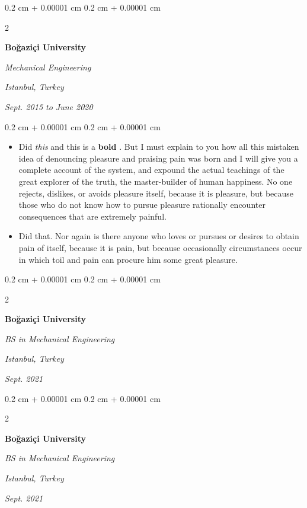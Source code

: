 \documentclass[10pt, letterpaper]{article}
\newenvironment{highlights}{
    \begin{itemize}[
        topsep=0.10 cm,
        parsep=0.10 cm,
        partopsep=0pt,
        itemsep=0pt,
        leftmargin=0.4 cm + 10pt
    ]
}{
    \end{itemize}
} %
\newenvironment{onecolentry}{
    \begin{adjustwidth}{
        0.2 cm + 0.00001 cm
    }{
        0.2 cm + 0.00001 cm
    }
}{
    \end{adjustwidth}
} %
\newenvironment{twocolentry}[2][]{
    \onecolentry
    \def\secondColumn{#2}
    \setcolumnwidth{\fill, 4.5 cm}
    \begin{paracol}{2}
}{
    \switchcolumn \raggedleft \secondColumn
    \end{paracol}
    \endonecolentry
} %
\let\hrefWithoutArrow\href
\renewcommand{\href}[2]{\hrefWithoutArrow{#1}{\mbox{\ifthenelse{\equal{#2}{}}{ }{#2 }\raisebox{.15ex}{\footnotesize \faExternalLink*}}}}
\begin{document}
        \vspace{0.2 cm-3px}

        \begin{twocolentry}{
        \textit{Istanbul, Turkey}    
            
        \textit{Sept. 2015 to June 2020}}
            \textbf{Boğaziçi University}

            \textit{Mechanical Engineering}
        \end{twocolentry}

        \vspace{0.10 cm-3px}
        \begin{onecolentry}
            \begin{highlights}
                \item Did \textit{this} and this is a \textbf{bold} \href{https://example.com}{link}. But I must explain to you how all this mistaken idea of denouncing pleasure and praising pain was born and I will give you a complete account of the system, and expound the actual teachings of the great explorer of the truth, the master-builder of human happiness. No one rejects, dislikes, or avoids pleasure itself, because it is pleasure, but because those who do not know how to pursue pleasure rationally encounter consequences that are extremely painful.
                \item Did that. Nor again is there anyone who loves or pursues or desires to obtain pain of itself, because it is pain, but because occasionally circumstances occur in which toil and pain can procure him some great pleasure.
            \end{highlights}
        \end{onecolentry}


        \vspace{0.2 cm-3px}

        \begin{twocolentry}{
        \textit{Istanbul, Turkey}    
            
        \textit{Sept. 2021}}
            \textbf{Boğaziçi University}

            \textit{BS in Mechanical Engineering}
        \end{twocolentry}



        \vspace{0.2 cm-3px}

        \begin{twocolentry}{
        \textit{Istanbul, Turkey}    
            
        \textit{Sept. 2021}}
            \textbf{Boğaziçi University}

            \textit{BS in Mechanical Engineering}
        \end{twocolentry}
\end{document}
